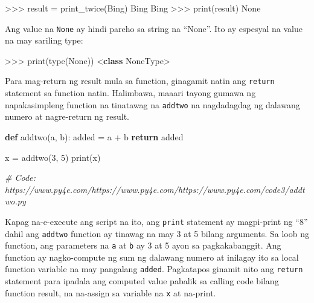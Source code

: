 \documentclass[10pt,]{book}
\newenvironment{Shaded}{}{}
\newcommand{\BuiltInTok}[1]{\textcolor[rgb]{0.00,0.50,0.00}{#1}}
\newcommand{\CommentTok}[1]{\textcolor[rgb]{0.38,0.63,0.69}{\textit{#1}}}
\newcommand{\ControlFlowTok}[1]{\textcolor[rgb]{0.00,0.44,0.13}{\textbf{#1}}}
\newcommand{\DecValTok}[1]{\textcolor[rgb]{0.25,0.63,0.44}{#1}}
\newcommand{\KeywordTok}[1]{\textcolor[rgb]{0.00,0.44,0.13}{\textbf{#1}}}
\newcommand{\NormalTok}[1]{#1}
\newcommand{\OperatorTok}[1]{\textcolor[rgb]{0.40,0.40,0.40}{#1}}
\newcommand{\StringTok}[1]{\textcolor[rgb]{0.25,0.44,0.63}{#1}}
\newcommand{\VariableTok}[1]{\textcolor[rgb]{0.10,0.09,0.49}{#1}}
\begin{document}
 

\begin{Shaded}
\begin{Highlighting}[]
\OperatorTok{\textgreater{}\textgreater{}\textgreater{}}\NormalTok{ result }\OperatorTok{=}\NormalTok{ print\_twice(}\StringTok{\textquotesingle{}Bing\textquotesingle{}}\NormalTok{)}
\NormalTok{Bing}
\NormalTok{Bing}
\OperatorTok{\textgreater{}\textgreater{}\textgreater{}} \BuiltInTok{print}\NormalTok{(result)}
\VariableTok{None}
\end{Highlighting}
\end{Shaded}

Ang value na \texttt{None} ay hindi pareho sa string na ``None''. Ito ay
espesyal na value na may sariling type:

\begin{Shaded}
\begin{Highlighting}[]
\OperatorTok{\textgreater{}\textgreater{}\textgreater{}} \BuiltInTok{print}\NormalTok{(}\BuiltInTok{type}\NormalTok{(}\VariableTok{None}\NormalTok{))}
\OperatorTok{\textless{}}\KeywordTok{class} \StringTok{\textquotesingle{}NoneType\textquotesingle{}}\OperatorTok{\textgreater{}}
\end{Highlighting}
\end{Shaded}

Para mag-return ng result mula sa function, ginagamit natin ang
\texttt{return} statement sa function natin. Halimbawa, maaari tayong
gumawa ng napakasimpleng function na tinatawag na \texttt{addtwo} na
nagdadagdag ng dalawang numero at nagre-return ng result.

\begin{Shaded}
\begin{Highlighting}[]
\KeywordTok{def}\NormalTok{ addtwo(a, b):}
\NormalTok{    added }\OperatorTok{=}\NormalTok{ a }\OperatorTok{+}\NormalTok{ b}
    \ControlFlowTok{return}\NormalTok{ added}

\NormalTok{x }\OperatorTok{=}\NormalTok{ addtwo(}\DecValTok{3}\NormalTok{, }\DecValTok{5}\NormalTok{)}
\BuiltInTok{print}\NormalTok{(x)}

\CommentTok{\# Code: https://www.py4e.com/https://www.py4e.com/https://www.py4e.com/code3/addtwo.py}
\end{Highlighting}
\end{Shaded}

Kapag na-e-execute ang script na ito, ang \texttt{print} statement ay
magpi-print ng ``8'' dahil ang \texttt{addtwo} function ay tinawag na
may 3 at 5 bilang arguments. Sa loob ng function, ang parameters na
\texttt{a} at \texttt{b} ay 3 at 5 ayon sa pagkakabanggit. Ang function
ay nagko-compute ng sum ng dalawang numero at inilagay ito sa local
function variable na may pangalang \texttt{added}. Pagkatapos ginamit
nito ang \texttt{return} statement para ipadala ang computed value
pabalik sa calling code bilang function result, na na-assign sa variable
na \texttt{x} at na-print.
\end{document}
